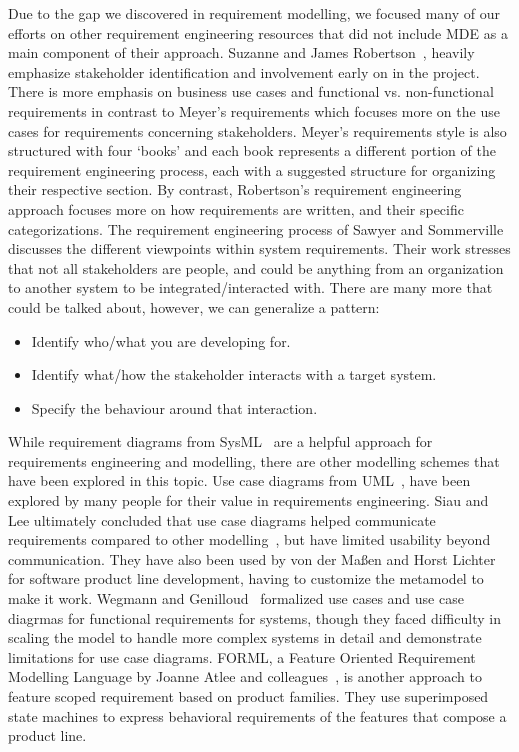 Due to the gap we discovered in requirement modelling, we focused many of our efforts on other requirement engineering resources that did not include \ac{MDE} as a main component of their approach. Suzanne and James Robertson~\cite{robertson2012mastering, robertson2000volere}, heavily emphasize stakeholder identification and involvement early on in the project. There is more emphasis on business use cases and functional vs. non-functional requirements in contrast to Meyer's requirements which focuses more on the use cases for requirements concerning stakeholders. Meyer's requirements style is also structured with four `books' and each book represents a different portion of the requirement engineering process, each with a suggested structure for organizing their respective section. By contrast, Robertson's requirement engineering approach focuses more on how requirements are written, and their specific categorizations. The requirement engineering process of Sawyer and Sommerville~\cite{sommerville1997requirements, sommerville1997viewpoints} discusses the different viewpoints within system requirements. Their work stresses that not all stakeholders are people, and could be anything from an organization to another system to be integrated/interacted with. There are many more that could be talked about, however, we can generalize a pattern:
\begin{itemize}
	\item Identify who/what you are developing for.
	\item Identify what/how the stakeholder interacts with a target system.
	\item Specify the behaviour around that interaction.
\end{itemize}

While requirement diagrams from SysML~\cite{sysml2019omg} are a helpful approach for requirements engineering and modelling, there are other modelling schemes that have been explored in this topic. Use case diagrams from UML~\cite{fowler2018uml}, have been explored by many people for their value in requirements engineering. Siau and Lee ultimately concluded that use case diagrams helped communicate requirements compared to other modelling~\cite{siau2004use}, but have limited usability beyond communication. They have also been used by von der Ma{\ss}en and Horst Lichter~\cite{von2002modeling} for software product line development, having to customize the metamodel to make it work. Wegmann and Genilloud~\cite{wegmann2000role} formalized use cases and use case diagrmas for functional requirements for systems, though they faced difficulty in scaling the model to handle more complex systems in detail and demonstrate limitations for use case diagrams. FORML, a Feature Oriented Requirement Modelling Language by Joanne Atlee and colleagues~\cite{Beidu2019, 6345799}, is another approach to feature scoped requirement based on product families. They use superimposed state machines to express behavioral requirements of the features that compose a product line.

